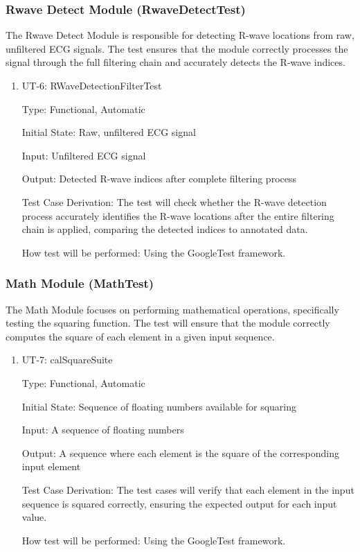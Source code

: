 \documentclass[12pt, titlepage]{article}
\begin{document}
\subsubsection{Rwave Detect Module (RwaveDetectTest)}

The Rwave Detect Module is responsible for detecting R-wave locations from raw,
unfiltered ECG signals. The test ensures that the module correctly processes the
signal through the full filtering chain and accurately detects the R-wave
indices.

\begin{enumerate}

\item{UT-6: RWaveDetectionFilterTest\\}

Type: Functional, Automatic
					
Initial State: Raw, unfiltered ECG signal
					
Input: Unfiltered ECG signal
					
Output: Detected R-wave indices after complete filtering process

Test Case Derivation: The test will check whether the R-wave detection process
accurately identifies the R-wave locations after the entire filtering chain is
applied, comparing the detected indices to annotated data.

How test will be performed: Using the GoogleTest framework.
    
\end{enumerate}

\subsubsection{Math Module (MathTest)}

The Math Module focuses on performing mathematical operations, specifically
testing the squaring function. The test will ensure that the module correctly
computes the square of each element in a given input sequence.

\begin{enumerate}

\item{UT-7: calSquareSuite\\}

Type: Functional, Automatic
					
Initial State: Sequence of floating numbers available for squaring
					
Input: A sequence of floating numbers
					
Output: A sequence where each element is the square of the corresponding input
element

Test Case Derivation: The test cases will verify that each element in the input
sequence is squared correctly, ensuring the expected output for each input
value.

How test will be performed: Using the GoogleTest framework.
    
\end{enumerate}
\end{document}
